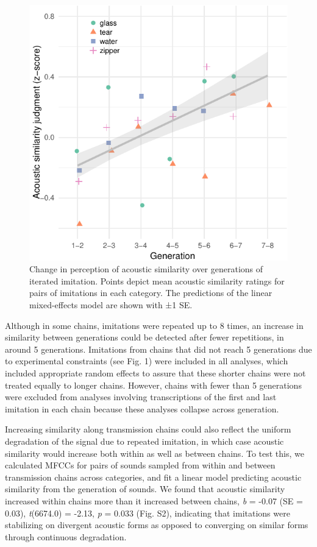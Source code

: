 \documentclass[english,floatsintext,man]{apa6}
\theoremstyle{definition}
\theoremstyle{definition}
\theoremstyle{definition}
\theoremstyle{remark}
\begin{document}
\begin{figure}
\centering
\includegraphics{fig2-1.pdf}
\caption{\label{fig:fig2}Change in perception of acoustic similarity over
generations of iterated imitation. Points depict mean acoustic
similarity ratings for pairs of imitations in each category. The
predictions of the linear mixed-effects model are shown with ±1 SE.}
\end{figure}

Although in some chains, imitations were repeated up to 8 times, an
increase in similarity between generations could be detected after fewer
repetitions, in around 5 generations. Imitations from chains that did
not reach 5 generations due to experimental constraints (see Fig. 1)
were included in all analyses, which included appropriate random effects
to assure that these shorter chains were not treated equally to longer
chains. However, chains with fewer than 5 generations were excluded from
analyses involving transcriptions of the first and last imitation in
each chain because these analyses collapse across generation.

Increasing similarity along transmission chains could also reflect the
uniform degradation of the signal due to repeated imitation, in which
case acoustic similarity would increase both within as well as between
chains. To test this, we calculated MFCCs for pairs of sounds sampled
from within and between transmission chains across categories, and fit a
linear model predicting acoustic similarity from the generation of
sounds. We found that acoustic similarity increased within chains more
than it increased between chains, \emph{b} = -0.07 (SE = 0.03),
\emph{t}(6674.0) = -2.13, \emph{p} = 0.033 (Fig. S2), indicating that
imitations were stabilizing on divergent acoustic forms as opposed to
converging on similar forms through continuous degradation.
\end{document}
